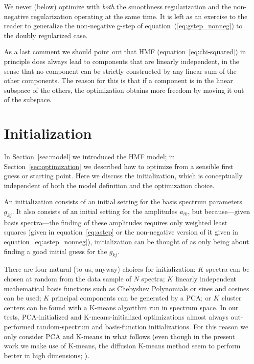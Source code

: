 \documentclass[12pt,preprint]{aastex}
\newcommand{\sectionname}{Section}
\newcommand{\equationname}{equation}
\begin{document}
We never (below) optimize with \emph{both} the smoothness
regularization and the non-negative regularization operating at the
same time.  It is left as an exercise to the reader to generalize the
non-negative g-step of \equationname~(\ref{eq:gstep_nonneg}) to the
doubly regularized case.

As a last comment we should point out that HMF (\equationname~\ref{eq:chi-squared}) in principle does always lead to components that are linearly independent, in the sense that no component can be strictly constructed by any linear sum of the other components.  The reason for this is that if a component is in the linear subspace of the others, the optimization obtains more freedom by moving it out of the subspace.

\section{Initialization}\label{sec:initialization}

In \sectionname~\ref{sec:model} we introduced the HMF model; in
\sectionname~\ref{sec:optimization} we described how to optimize from
a sensible first guess or starting point.  Here we discuss the
initialization, which is conceptually independent of both the model
definition and the optimization choice.

An initialization consists of an initial setting for the basis
spectrum parameters $g_{kj}$.  It also consists of an initial setting
for the amplitudes $a_{ik}$, but because---given basis spectra---the
finding of these amplitudes requires only weighted least squares
(given in \equationname~\ref{eq:astep} or the non-negative version of
it given in \equationname~\ref{eq:astep_nonneg}), initialization can
be thought of as only being about finding a good initial guess for the
$g_{kj}$.

There are four natural (to us, anyway) choices for initialization: $K$
spectra can be chosen at random from the data sample of $N$ spectra;
$K$ linearly independent mathematical basis functions such as
Chebyshev Polynomials or sines and cosines can be used; $K$ principal
components can be generated by a PCA; or $K$ cluster centers can be
found with a K-means algorithm run in spectrum space.  In our tests,
PCA-initialized and K-means-initialized optimizations almost always
out-performed random-spectrum and basis-function initializations.  For
this reason we only consider PCA and K-means in what follows 
(even though in the present work we make use of K-means, 
the diffusion K-means method seem to perform better in high dimensions; \citealt{richards}).
\end{document}
